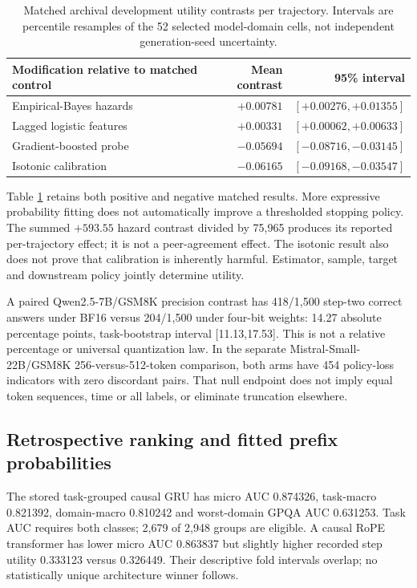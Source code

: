 \documentclass{article}
\begin{document}
\begin{table}[t]
\centering
\caption{Matched archival development utility contrasts per trajectory.
Intervals are percentile resamples of the 52 selected model-domain cells,
not independent generation-seed uncertainty.}
\label{tab:contrasts}
\begin{tabular}{lrr}
\toprule
Modification relative to matched control & Mean contrast & 95\% interval\\
\midrule
Empirical-Bayes hazards & \(+0.00781\) & \([+0.00276,+0.01355]\)\\
Lagged logistic features & \(+0.00331\) & \([+0.00062,+0.00633]\)\\
Gradient-boosted probe & \(-0.05694\) & \([-0.08716,-0.03145]\)\\
Isotonic calibration & \(-0.06165\) & \([-0.09168,-0.03547]\)\\
\bottomrule
\end{tabular}
\end{table}

Table \ref{tab:contrasts} retains both positive and negative matched results.
More expressive probability fitting does not automatically improve a
thresholded stopping policy. The summed \(+593.55\) hazard contrast divided by
75,965 produces its reported per-trajectory effect; it is not a peer-agreement
effect. The isotonic result also does not prove that calibration is inherently
harmful. Estimator, sample, target and downstream policy jointly determine
utility.

A paired Qwen2.5-7B/GSM8K precision contrast has 418/1,500 step-two correct
answers under BF16 versus 204/1,500 under four-bit weights: 14.27 absolute
percentage points, task-bootstrap interval [11.13,17.53]. This is not a
relative percentage or universal quantization law. In the separate
Mistral-Small-22B/GSM8K 256-versus-512-token comparison, both arms have 454
policy-loss indicators with zero discordant pairs. That null endpoint does
not imply equal token sequences, time or all labels, or eliminate truncation
elsewhere.

\subsection{Retrospective ranking and fitted prefix probabilities}
The stored task-grouped causal GRU has micro AUC 0.874326, task-macro 0.821392,
domain-macro 0.810242 and worst-domain GPQA AUC 0.631253. Task AUC requires both
classes; 2,679 of 2,948 groups are eligible. A causal RoPE transformer has
lower micro AUC 0.863837 but slightly higher recorded step utility
0.333123 versus 0.326449. Their descriptive fold intervals overlap;
no statistically unique architecture winner follows.
\end{document}
